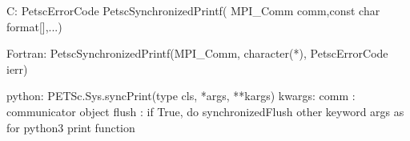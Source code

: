 C:
PetscErrorCode  PetscSynchronizedPrintf(
    MPI_Comm comm,const char format[],...)

Fortran:
PetscSynchronizedPrintf(MPI_Comm, character(*), PetscErrorCode ierr)

python:
PETSc.Sys.syncPrint(type cls, *args, **kargs)
kwargs:
comm : communicator object
flush : if True, do synchronizedFlush
other keyword args as for python3 print function
